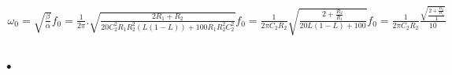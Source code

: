 \begin{align}

	\begin{equation}
		\omega_0 = \sqrt{\frac{\beta}{\alpha}}
	\end{equation}
	
	\begin{equation}
		f_0 = \frac{1}{2\pi} . \sqrt{ \frac{2R_1 + R_2 }{ 20 C_2^2 R_1 R_2^2 (L (1-L)) + 100R_1 R_2^2C_2^2 } }
	\end{equation}
	
	\begin{equation}
		f_0 = \frac{1}{2\pi C_2 R_2} \sqrt{ \frac{2 + \frac{R_2}{R_1} }{ 20L(1-L) + 100 } }
	\end{equation}		
	\label{f0sinsimplificar}
	
	\begin{equation}
		f_0 = \frac{1}{2\pi C_2 R_2} \frac{ \sqrt{ \frac{2 + \frac{R_2}{R_1} }{ 1 } } }{ 10 }
	\end{equation}
	\label{f0final}
	
\end{align}

\subsubsection{•}